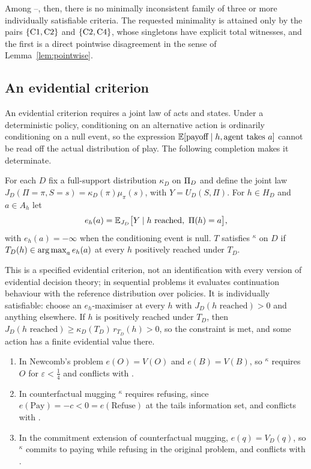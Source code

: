 Among --, then, there is no minimally inconsistent family of three or more
individually satisfiable criteria. The requested minimality is attained only by the pairs
$\{\textup{C1},\textup{C2}\}$ and $\{\textup{C2},\textup{C4}\}$, whose singletons have explicit total witnesses, and
the first is a direct pointwise disagreement in the sense of Lemma~\ref{lem:pointwise}.

\subsection{An evidential criterion}\label{sec:evidential}

An evidential criterion requires a joint law of acts and states. Under a deterministic policy,
conditioning on an alternative action is ordinarily conditioning on a null event, so the expression
$\mathbb{E}[\text{payoff}\mid h,\text{agent takes }a]$ cannot be read off the actual distribution of play.
The following completion makes it determinate.

\begin{definition}
For each $D$ fix a full-support distribution $\kappa_D$ on $\Pi_D$ and define the joint law
$J_D(\Pi=\pi,S=s)=\kappa_D(\pi)\mu_\pi(s)$, with $Y=U_D(S,\Pi)$. For $h\in H_D$ and $a\in A_h$ let
\[
  e_h(a)=\mathbb{E}_{J_D}\bigl[Y\mid h\text{ reached},\ \Pi(h)=a\bigr],
\]
with $e_h(a)=-\infty$ when the conditioning event is null. $T$ satisfies $^\kappa$ on $D$ if
$T_D(h)\in\operatorname*{arg\,max}_a e_h(a)$ at every $h$ positively reached under $T_D$.
\end{definition}

This is a specified evidential criterion, not an identification with every version of evidential
decision theory; in sequential problems it evaluates continuation behaviour with the reference
distribution over policies. It is individually satisfiable: choose an $e_h$-maximiser at every $h$
with $J_D(h\text{ reached})>0$ and anything elsewhere. If $h$ is positively reached under $T_D$, then
$J_D(h\text{ reached})\ge\kappa_D(T_D)\,r_{T_D}(h)>0$, so the constraint is met, and some action has
a finite evidential value there.

\begin{proposition}\label{prop:c6}
\begin{enumerate}[label=(\roman*)]
  \item In Newcomb's problem $e(O)=V(O)$ and $e(B)=V(B)$, so $^\kappa$ requires $O$ for
        $\varepsilon<\tfrac14$ and conflicts with .
  \item In counterfactual mugging $^\kappa$ requires refusing, since $e(\text{Pay})=-c<0=e(\text{Refuse})$
        at the tails information set, and conflicts with .
  \item In the commitment extension of counterfactual mugging, $e(q)=V_D(q)$, so $^\kappa$
        commits to paying while refusing in the original problem, and conflicts with .
\end{enumerate}
\end{proposition}

